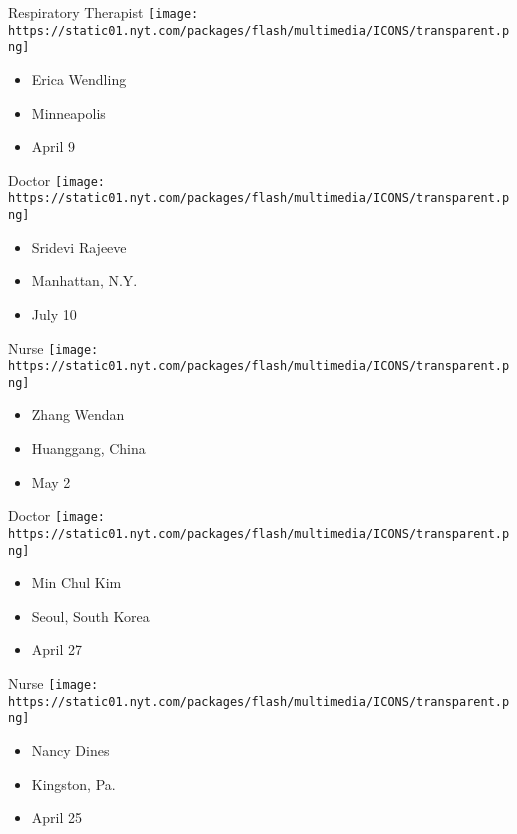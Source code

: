 \protect\hyperlink{item-erica-wendling}{}

Respiratory Therapist
\texttt{[image: https://static01.nyt.com/packages/flash/multimedia/ICONS/transparent.png]}

\begin{itemize}
\tightlist
\item
  Erica Wendling
\item
  Minneapolis
\item
  April 9
\end{itemize}

\protect\hyperlink{item-sridevi-rajeeve}{}

Doctor
\texttt{[image: https://static01.nyt.com/packages/flash/multimedia/ICONS/transparent.png]}

\begin{itemize}
\tightlist
\item
  Sridevi Rajeeve
\item
  Manhattan, N.Y.
\item
  July 10
\end{itemize}

\protect\hyperlink{item-zhang-wendan}{}

Nurse
\texttt{[image: https://static01.nyt.com/packages/flash/multimedia/ICONS/transparent.png]}

\begin{itemize}
\tightlist
\item
  Zhang Wendan
\item
  Huanggang, China
\item
  May 2
\end{itemize}

\protect\hyperlink{item-min-chul-kim}{}

Doctor
\texttt{[image: https://static01.nyt.com/packages/flash/multimedia/ICONS/transparent.png]}

\begin{itemize}
\tightlist
\item
  Min Chul Kim
\item
  Seoul, South Korea
\item
  April 27
\end{itemize}

\protect\hyperlink{item-nancy-dines}{}

Nurse
\texttt{[image: https://static01.nyt.com/packages/flash/multimedia/ICONS/transparent.png]}

\begin{itemize}
\tightlist
\item
  Nancy Dines
\item
  Kingston, Pa.
\item
  April 25
\end{itemize}


